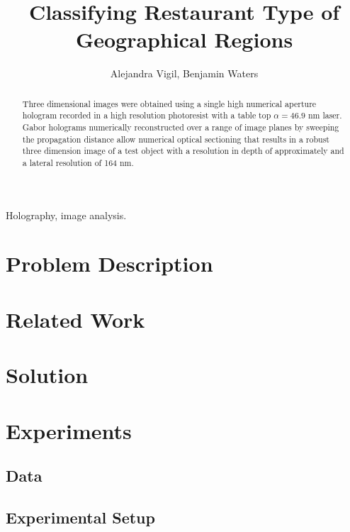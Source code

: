 \documentclass[]{IEEEphot}
\begin{document}
\title{Classifying Restaurant Type of Geographical Regions}

\author{Alejandra Vigil, Benjamin Waters}


\maketitle



\begin{abstract}
Three dimensional images were obtained using a single high numerical aperture hologram recorded in a high resolution photoresist with a table top $\alpha = 46.9$ nm laser. Gabor holograms numerically reconstructed over a range of image planes by sweeping the propagation distance allow numerical optical sectioning that results in a robust three dimension image of a test object with a resolution in depth of approximately and a lateral resolution of 164 nm. 
\end{abstract}

\begin{IEEEkeywords}
Holography, image analysis.
\end{IEEEkeywords}

\section{Problem Description}


\section{Related Work}


\section{Solution}

\section{Experiments}
\subsection{Data}
\subsection{Experimental Setup}
\end{document}
